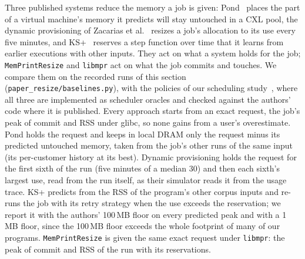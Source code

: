 \documentclass[11pt]{article}
\newcommand{\libmpr}{\texttt{libmpr}}
\newcommand{\pass}{\texttt{MemPrintResize}}
\begin{document}
\begin{table}[t]
\centering\small
\resizebox{\linewidth}{!}{}
\caption{Per workload: the time-averaged memory held (MB, mean of three runs) when the demand is the larger of commit and
RSS. KS+ with the 1\,MB floor; its failures (re-executions per run) in parentheses. MPR: \libmpr{} with its own
profile.}
\label{tab:baselines-workloads}
\end{table}

Three published systems reduce the memory a job is given: Pond~\cite{Li2023Pond} places the part of a virtual
machine's memory it predicts will stay untouched in a CXL pool, the dynamic provisioning of Zacarias et
al.~\cite{Zacarias2023Dynamic} resizes a job's allocation to its use every five minutes, and KS+~\cite{KSplus2024}
reserves a step function over time that it learns from earlier executions with other inputs. They act on what a
system holds for the job; \pass{} and \libmpr{} act on what the job commits and touches. We compare them on the
recorded runs of this section (\texttt{paper\_resize/baselines.py}), with the policies of our scheduling
study~\cite{memprintsched}, where all three are implemented as scheduler oracles and checked against the authors'
code where it is published. Every approach starts from an exact request, the job's peak of commit and RSS under
glibc, so none gains from a user's overestimate. Pond holds the request and keeps in local DRAM only the request minus
its predicted untouched memory, taken from the job's other runs of the same input (its per-customer history at its
best). Dynamic provisioning holds the request for the first sixth of the run (five minutes of a median 30) and then
each sixth's largest use, read from the run itself, as their simulator reads it from the usage trace. KS+ predicts
from the RSS of the program's other corpus inputs and re-runs the job with its retry strategy when the use exceeds
the reservation; we report it with the authors' 100\,MB floor on every predicted peak and with a 1\,MB floor,
since the 100\,MB floor exceeds the whole footprint of many of our programs. \pass{} is given the same exact request
under \libmpr{}: the peak of commit and RSS of the run with its reservations.
\end{document}
